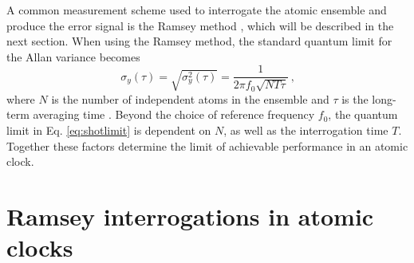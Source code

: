 A common measurement scheme used to interrogate the atomic ensemble and produce the error signal  is the Ramsey method \cite{Rosenband, Ramsey}, which will be described in the next section. When using the Ramsey method, the standard quantum limit for the Allan variance becomes 
\begin{equation}
\sigma_y (\tau) = \sqrt{\sigma_y^2 (\tau)} = \frac{1}{2 \pi f_0 \sqrt{N T \tau}} \ \text{,}
\label{eq:shotlimit}
\end{equation}
where $N$ is the number of independent atoms in the ensemble and $\tau$ is the long-term averaging time \cite{Itano1993}. Beyond the choice of reference frequency $f_0$, the quantum limit in Eq. \ref{eq:shotlimit} is dependent on $N$, as well as the interrogation time $T$. Together these factors determine the limit of achievable performance in an atomic clock. 






\section{Ramsey interrogations in atomic clocks}

